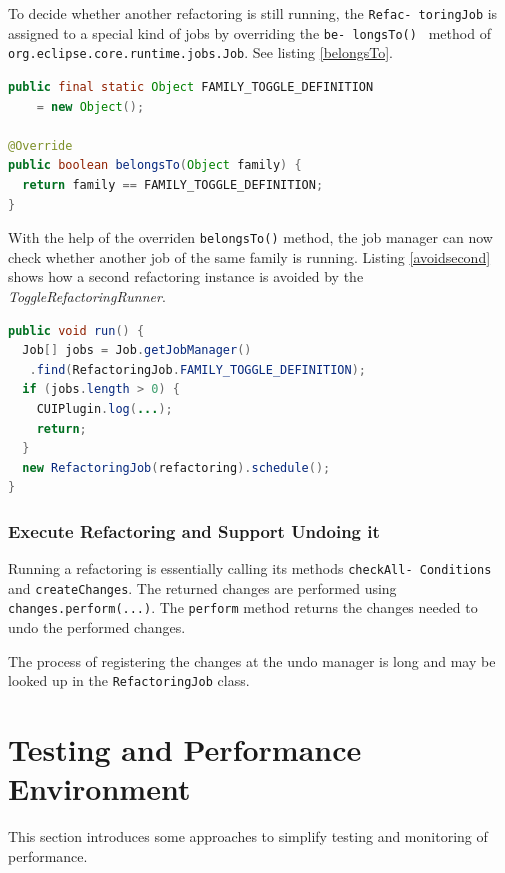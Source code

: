 To decide whether another refactoring is still running, the \texttt{Refac- 
toringJob} is assigned to a special kind of jobs by overriding the \texttt{be- 
longsTo() } method of \texttt{org.eclipse.core.runtime.jobs.Job}. See listing 
\ref{belongsTo}.

\begin{lstlisting}[caption={RefactoringJob is assigned to a separate family of 
jobs},label={belongsTo},language=java]
public final static Object FAMILY_TOGGLE_DEFINITION
    = new Object();

@Override
public boolean belongsTo(Object family) {
  return family == FAMILY_TOGGLE_DEFINITION;
}
\end{lstlisting}

With the help of the overriden \texttt{belongsTo()} method, the job manager can 
now check whether another job of the same family is running. Listing 
\ref{avoidsecond} shows how a second refactoring instance is avoided by the 
\textit{ToggleRefactoringRunner}.

\begin{lstlisting}[caption={ToggleRefactoringRunner avoiding a 2$^{nd}$ refactoring instance},
label={avoidsecond}, language=Java]
public void run() {
  Job[] jobs = Job.getJobManager()
   .find(RefactoringJob.FAMILY_TOGGLE_DEFINITION);
  if (jobs.length > 0) {
    CUIPlugin.log(...);
    return;
  }
  new RefactoringJob(refactoring).schedule();
}
\end{lstlisting}


\subsubsection{Execute Refactoring and Support Undoing it}
Running a refactoring is essentially calling its methods 
\texttt{checkAll- Conditions} and \texttt{createChanges}. The returned 
changes are performed using \texttt{changes.perform(...)}. The 
\texttt{perform} method returns the changes needed to undo the performed 
changes.

The process of registering the changes at the undo manager is long and may be 
looked up in the \texttt{RefactoringJob} class.

\section{Testing and Performance Environment}

This section introduces some approaches to simplify testing and monitoring of 
performance.

